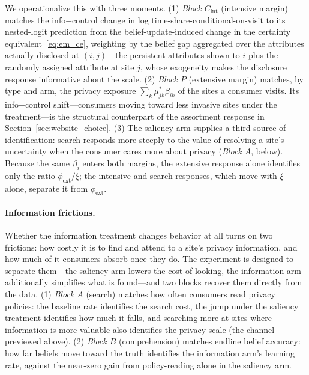 \documentclass[12pt]{article}
\theoremstyle{definition}
\theoremstyle{remark}
\begin{document}
We operationalize this with three moments. (1) \emph{Block $C_{\text{int}}$} (intensive margin) matches the info$-$control change in log time-share-conditional-on-visit to its nested-logit prediction from the belief-update-induced change in the certainty equivalent~\eqref{eq:em_ce}, weighting by the belief gap aggregated over the attributes actually disclosed at $(i,j)$---the persistent attributes shown to $i$ plus the randomly assigned attribute at site $j$, whose exogeneity makes the disclosure response informative about the scale. (2) \emph{Block $P$} (extensive margin) matches, by type and arm, the privacy exposure $\sum_k \mu^*_{jk}\beta_{ik}$ of the sites a consumer visits. Its info$-$control shift---consumers moving toward less invasive sites under the treatment---is the structural counterpart of the assortment response in Section~\ref{sec:website_choice}. (3) The saliency arm supplies a third source of identification: search responds more steeply to the value of resolving a site's uncertainty when the consumer cares more about privacy (\emph{Block $A$}, below). Because the same $\beta_i$ enters both margins, the extensive response alone identifies only the ratio $\phi_{\text{ext}}/\xi$; the intensive and search responses, which move with $\xi$ alone, separate it from $\phi_{\text{ext}}$.

\paragraph{Information frictions.} Whether the information treatment changes behavior at all turns on two frictions: how costly it is to find and attend to a site's privacy information, and how much of it consumers absorb once they do. The experiment is designed to separate them---the saliency arm lowers the cost of looking, the information arm additionally simplifies what is found---and two blocks recover them directly from the data. (1) \emph{Block $A$} (search) matches how often consumers read privacy policies: the baseline rate identifies the search cost, the jump under the saliency treatment identifies how much it falls, and searching more at sites where information is more valuable also identifies the privacy scale (the channel previewed above).  (2) \emph{Block $B$} (comprehension) matches endline belief accuracy: how far beliefs move toward the truth identifies the information arm's learning rate, against the near-zero gain from policy-reading alone in the saliency arm.
\end{document}
